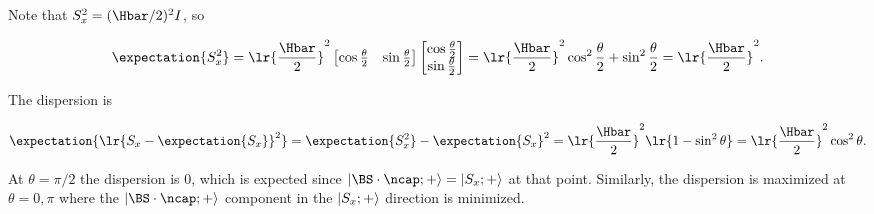 {Note that \( S_x^2 = (\Hbar/2)^2I \), so

\begin{dmath}\label{eqn:moreBraKetProblems:800}
\expectation{S_x^2}
=
\lr{\frac{\Hbar}{2}}^2
\begin{bmatrix}
\cos\frac{\theta}{2} & \sin\frac{\theta}{2}
\end{bmatrix}
\begin{bmatrix}
\cos\frac{\theta}{2} \\
\sin\frac{\theta}{2}
\end{bmatrix}
=
\lr{ \frac{\Hbar}{2} }^2
\cos^2\frac{\theta}{2} + \sin^2 \frac{\theta}{2}
=
\lr{ \frac{\Hbar}{2} }^2.
\end{dmath}

The dispersion is

\begin{dmath}\label{eqn:moreBraKetProblems:820}
\expectation{\lr{ S_x - \expectation{S_x}}^2}
=
\expectation{S_x^2} - \expectation{S_x}^2
=
\lr{ \frac{\Hbar}{2} }^2
\lr{1 - \sin^2 \theta}
=
\lr{ \frac{\Hbar}{2} }^2
\cos^2 \theta.
\end{dmath}

At \( \theta = \pi/2 \) the dispersion is 0, which is expected since \( \ket{\BS \cdot \ncap ; + } = \ket{ S_x ; + } \) at that point.  Similarly, the dispersion is maximized at \( \theta = 0,\pi \) where the \( \ket{\BS \cdot \ncap ; + } \) component in the \( \left\lvert {S_x ; + } \right\rangle \) direction is minimized.

} %
